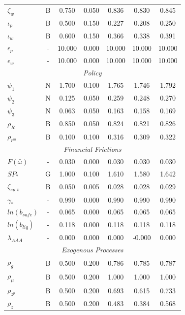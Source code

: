\documentclass[12pt]{article}
\begin{document}
{\begin{longtable}{lcccccc}
$\zeta_w$ & B &    0.750 &    0.050 &    0.836 &    0.830 &    0.845 \\
$\iota_p$ & B &    0.500 &    0.150 &    0.227 &    0.208 &    0.250 \\
$\iota_w$ & B &    0.600 &    0.150 &    0.366 &    0.338 &    0.391 \\
$\epsilon_{p}$ & - &   10.000 &    0.000 &   10.000 &   10.000 &   10.000 \\
$\epsilon_{w}$ & - &   10.000 &    0.000 &   10.000 &   10.000 &   10.000 \\
\multicolumn{7}{c}{\textit{Policy}} \\[3pt]
$\psi_1$ & N &    1.700 &    0.100 &    1.765 &    1.746 &    1.792 \\
$\psi_2$ & N &    0.125 &    0.050 &    0.259 &    0.248 &    0.270 \\
$\psi_3$ & N &    0.063 &    0.050 &    0.163 &    0.158 &    0.169 \\
$\rho_R$ & B &    0.850 &    0.050 &    0.824 &    0.821 &    0.826 \\
$\rho_{r^m}$ & B &    0.100 &    0.100 &    0.316 &    0.309 &    0.322 \\
\multicolumn{7}{c}{\textit{Financial Frictions}} \\[3pt]
$F(\bar{\omega})$ & - &    0.030 &    0.000 &    0.030 &    0.030 &    0.030 \\
$SP_*$ & G &    1.000 &    0.100 &    1.610 &    1.580 &    1.642 \\
$\zeta_{sp,b}$ & B &    0.050 &    0.005 &    0.028 &    0.028 &    0.029 \\
$\gamma_*$ & - &    0.990 &    0.000 &    0.990 &    0.990 &    0.990 \\
$ln(b_{safe})$ & - &    0.065 &    0.000 &    0.065 &    0.065 &    0.065 \\
$ln(b_{liq})$ & - &    0.118 &    0.000 &    0.118 &    0.118 &    0.118 \\
$\lambda_{AAA}$ & - &    0.000 &    0.000 &    0.000 &   -0.000 &    0.000 \\
\multicolumn{7}{c}{\textit{Exogenous Processes}} \\[3pt]
$\rho_g$ & B &    0.500 &    0.200 &    0.786 &    0.785 &    0.787 \\
$\rho_{\mu}$ & B &    0.500 &    0.200 &    1.000 &    1.000 &    1.000 \\
$\rho_{z^p}$ & B &    0.500 &    0.200 &    0.693 &    0.615 &    0.733 \\
$\rho_z$ & B &    0.500 &    0.200 &    0.483 &    0.384 &    0.568 \\

\end{longtable}}
\end{document}
